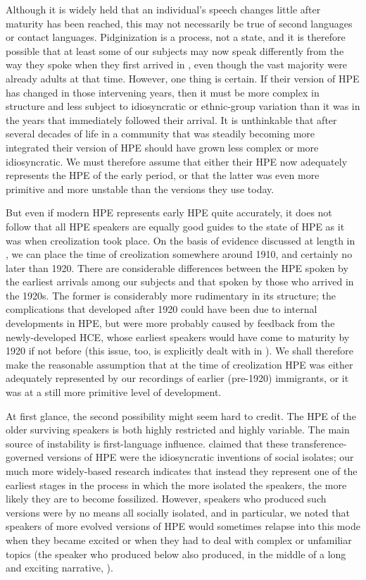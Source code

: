 Although it is widely held that an individual's speech changes little after maturity has been reached, this may not necessarily be true of second languages or contact languages. Pidginization is a process, not a state, and it is therefore possible that at least some of our subjects may now speak differently from the way they spoke when they first arrived in , even though the vast majority were already adults at that time. However, one thing is certain. If their version of HPE has changed in those intervening years, then it must be more complex in structure and less subject to idiosyncratic or ethnic-group variation than it was in the years that immediately followed their arrival. It is unthinkable that after several decades of life in a community that was steadily becoming more integrated their version of HPE should have grown less complex or more idiosyncratic. We must therefore assume that either their HPE now adequately represents the HPE of the early  period, or that the latter was even more primitive and more unstable than the versions they use today.

\newpage But even if modern HPE represents early HPE quite accurately, it does not follow that all HPE speakers are equally good guides to the state of HPE as it was when creolization took place. On the basis of evidence discussed at length in \citet{Bickerton1977}, we can place the time of creolization somewhere around 1910, and certainly no later than 1920. There are considerable differences between the HPE spoken by
the earliest arrivals among our subjects and that spoken by those who arrived in the 1920s. The former is considerably more rudimentary in its structure; the complications that developed after 1920 could have been due to internal developments in HPE, but were more probably caused by feedback from the newly-developed HCE, whose earliest speakers would have come to maturity by 1920 if not before (this issue, too, is explicitly dealt with in \citealt[Chapter~4]{Bickerton1977}). We shall therefore make the reasonable assumption that at the time of creolization HPE was either adequately represented by our recordings of earlier (pre-1920) immigrants, or it was at a still more primitive level of development.

At first glance, the second possibility might seem hard to credit. The HPE of the older surviving speakers is both highly restricted and highly variable. The main source of instability is first-language influence. \citet{Labov1971} claimed that these transference-governed versions of HPE were the idiosyncratic inventions of social isolates; our much more widely-based research indicates that instead they represent one of the earliest stages in the  process in which the more isolated the speakers, the more likely they are to become fossilized. However, speakers who produced such versions were by no means all socially isolated, and in particular, we noted that speakers of more evolved versions of HPE would sometimes relapse into this mode when they became excited or when they had to deal with complex or unfamiliar topics (the speaker who produced  below also produced, in the middle of a long and exciting narrative, ).

